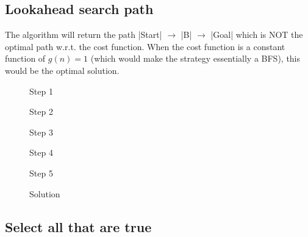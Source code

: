 \documentclass{homework}
\begin{document}
\exercise[3]

\subsection{Lookahead search path}
The algorithm will return the path \cverb|Start| $\xrightarrow{}$ \cverb|B| $\xrightarrow{}$ \cverb|Goal| which is NOT the optimal path w.r.t. the cost function.
When the cost function is a constant function of $g(n) = 1$ (which would make the strategy essentially a BFS), this would be the optimal solution.

\begin{figure}[h!]
    \centering
    
    \caption{Step 1}
    \label{fig:q3_1}
\end{figure}

\begin{figure}[h!]
    \centering
    
    \caption{Step 2}
    \label{fig:q3_2}
\end{figure}

\begin{figure}[h!]
    \centering
    
    \caption{Step 3}
    \label{fig:q3_3}
\end{figure}

\begin{figure}[h!]
    \centering
    
    \caption{Step 4}
    \label{fig:q3_4}
\end{figure}

\begin{figure}[h!]
    \centering
    
    \caption{Step 5}
    \label{fig:q3_5}
\end{figure}

\begin{figure}[h!]
    \centering
    
    \caption{Solution}
    \label{fig:q3_6}
\end{figure}
\clearpage
\subsection{Select all that are true}
\end{document}
